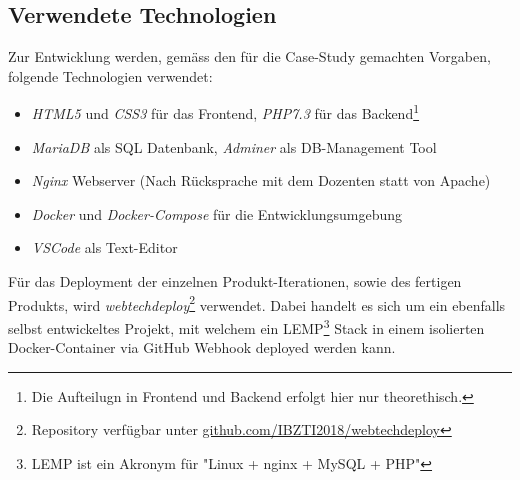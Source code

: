 \subsection{Verwendete Technologien}

Zur Entwicklung werden, gemäss den für die Case-Study gemachten Vorgaben, folgende Technologien verwendet:

\begin{itemize}
  \item \emph{HTML5} und \emph{CSS3} für das Frontend, \emph{PHP7.3} für das Backend\footnote{Die Aufteilugn in Frontend und Backend erfolgt hier nur theorethisch.}
  \item \emph{MariaDB} als SQL Datenbank, \emph{Adminer} als DB-Management Tool
  \item \emph{Nginx} Webserver (Nach Rücksprache mit dem Dozenten statt von Apache)
  \item \emph{Docker} und \emph{Docker-Compose} für die Entwicklungsumgebung
  \item \emph{VSCode} als Text-Editor
\end{itemize}

\noindent
Für das Deployment der einzelnen Produkt-Iterationen, sowie des fertigen Produkts, wird \emph{webtechdeploy}\footnote{Repository verfügbar unter \href{https://github.com/IBZTI2018/webtechdeploy}{github.com/IBZTI2018/webtechdeploy}} verwendet.
Dabei handelt es sich um ein ebenfalls selbst entwickeltes Projekt, mit welchem ein LEMP\footnote{LEMP ist ein Akronym für "Linux + nginx + MySQL + PHP"} Stack in einem isolierten Docker-Container via GitHub Webhook deployed werden kann.
